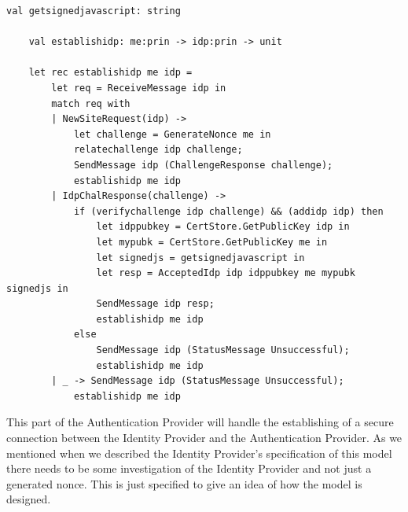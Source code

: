 \documentclass[twosided]{report}
\begin{document}
\begin{lstlisting}[style=fstar, caption={Established a secure connection with the Identity Provider}]
	val getsignedjavascript: string

	val establishidp: me:prin -> idp:prin -> unit

	let rec establishidp me idp =
		let req = ReceiveMessage idp in
		match req with
		| NewSiteRequest(idp) ->
			let challenge = GenerateNonce me in
			relatechallenge idp challenge;
			SendMessage idp (ChallengeResponse challenge);
			establishidp me idp
		| IdpChalResponse(challenge) ->
			if (verifychallenge idp challenge) && (addidp idp) then
				let idppubkey = CertStore.GetPublicKey idp in
				let mypubk = CertStore.GetPublicKey me in
				let signedjs = getsignedjavascript in
				let resp = AcceptedIdp idp idppubkey me mypubk signedjs in
				SendMessage idp resp;
				establishidp me idp
			else
				SendMessage idp (StatusMessage Unsuccessful);
				establishidp me idp
		| _ -> SendMessage idp (StatusMessage Unsuccessful);
			establishidp me idp
\end{lstlisting}
This part of the Authentication Provider will handle the establishing of a secure connection between the Identity Provider and the Authentication Provider. As we mentioned when we described the Identity Provider's specification of this model there needs to be some investigation of the Identity Provider and not just a generated nonce. This is just specified to give an idea of how the model is designed.
\end{document}
